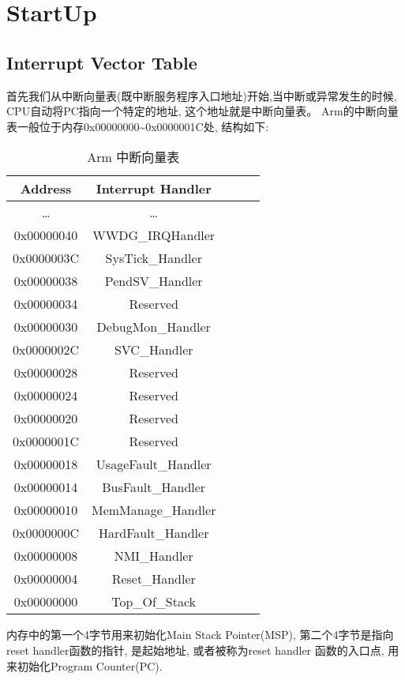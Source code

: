 \section{StartUp}
\subsection{Interrupt Vector Table}
首先我们从中断向量表(既中断服务程序入口地址)开始,当中断或异常发生的时候, CPU自动将PC指向一个特定的地址, 这个地址就是中断向量表。 Arm的中断向量表一般位于内存0x00000000\textasciitilde0x0000001C处, 结构如下:
\begin{table}[htbp]
    \caption{ Arm 中断向量表}\label{tab:table1}
    \vspace{0.5em}\centering\wuhao
    \begin{tabular}{ccccc}
    \toprule[1.5pt]
    Address & Interrupt Handler \\
    \midrule[1pt]
    \dots & \dots \\
    0x00000040 & WWDG\_IRQHandler \\
    0x0000003C & SysTick\_Handler \\
    0x00000038 & PendSV\_Handler \\
    0x00000034 & Reserved \\
    0x00000030 & DebugMon\_Handler \\
    0x0000002C & SVC\_Handler \\
    0x00000028 & Reserved \\
    0x00000024 & Reserved \\
    0x00000020 & Reserved \\
    0x0000001C & Reserved \\
    0x00000018 & UsageFault\_Handler \\
    0x00000014 & BusFault\_Handler \\
    0x00000010 & MemManage\_Handler \\
    0x0000000C & HardFault\_Handler \\
    0x00000008 & NMI\_Handler \\
    0x00000004 & Reset\_Handler \\
    0x00000000 & Top\_Of\_Stack \\
    \bottomrule[1.5pt]
    \end{tabular}
    \vspace{\baselineskip}
    \end{table}

内存中的第一个4字节用来初始化Main Stack Pointer(MSP), 第二个4字节是指向reset handler函数的指针, 是起始地址, 或者被称为reset handler 函数的入口点, 用来初始化Program Counter(PC).

